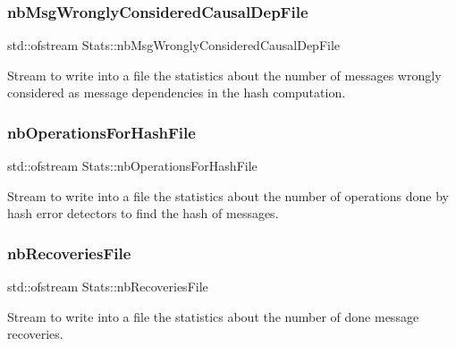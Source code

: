 \subsubsection{\texorpdfstring{nb\+Msg\+Wrongly\+Considered\+Causal\+Dep\+File}{nbMsgWronglyConsideredCausalDepFile}}
{\footnotesize\ttfamily std\+::ofstream Stats\+::nb\+Msg\+Wrongly\+Considered\+Causal\+Dep\+File\hspace{0.3cm}{\ttfamily [private]}}



Stream to write into a file the statistics about the number of messages wrongly considered as message dependencies in the hash computation. 

\mbox{\label{class_stats_a80fd6543223c0e25e2dbab085b1822f6}} 
\subsubsection{\texorpdfstring{nb\+Operations\+For\+Hash\+File}{nbOperationsForHashFile}}
{\footnotesize\ttfamily std\+::ofstream Stats\+::nb\+Operations\+For\+Hash\+File\hspace{0.3cm}{\ttfamily [private]}}



Stream to write into a file the statistics about the number of operations done by hash error detectors to find the hash of messages. 

\mbox{\label{class_stats_a8c4fd9f4c18e074cbc4b69d611ec4977}} 
\subsubsection{\texorpdfstring{nb\+Recoveries\+File}{nbRecoveriesFile}}
{\footnotesize\ttfamily std\+::ofstream Stats\+::nb\+Recoveries\+File\hspace{0.3cm}{\ttfamily [private]}}



Stream to write into a file the statistics about the number of done message recoveries. 

\mbox{\label{class_stats_a26404a5110226c52970e3c261c6d8126}} 
